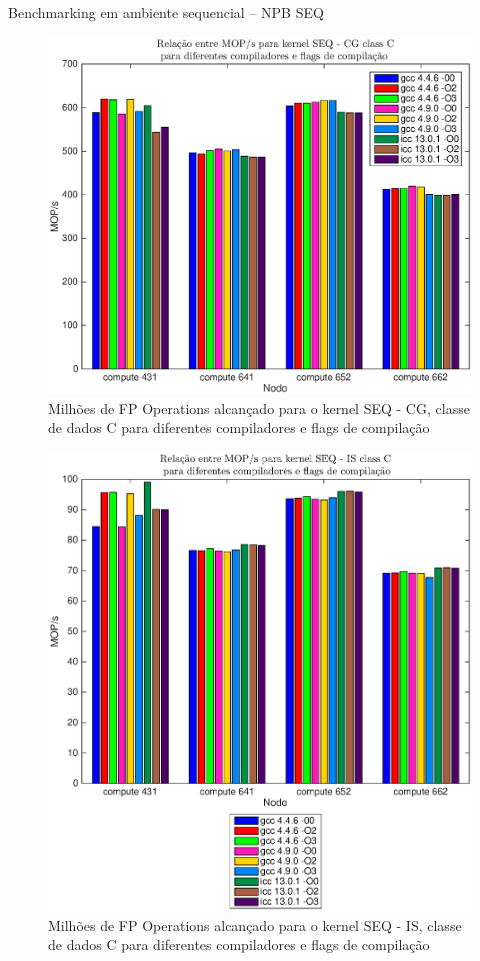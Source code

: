 \documentclass{beamer}
\begin{document}
   \begin{frame}{Benchmarking em ambiente sequencial -- NPB SEQ}


\begin{figure}[H]
\centering
\includegraphics[width=1.1\columnwidth]{EPS/SEQ/MOPS_seq_cg_C.eps}
\caption{Milhões de FP Operations alcançado para o kernel SEQ - CG, classe de dados C para diferentes compiladores e flags de compilação}
\label{mops_seq_cg_c}
\end{figure}

\begin{figure}[H]
\centering
\includegraphics[width=1.1\columnwidth]{EPS/SEQ/MOPS_seq_is_C.eps}
\caption{Milhões de FP Operations alcançado para o kernel SEQ - IS, classe de dados C para diferentes compiladores e flags de compilação}
\label{mops_seq_is_c}
\end{figure}


\end{frame}
\end{document}
